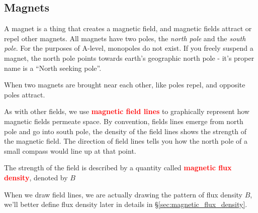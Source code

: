 \documentclass[a4paper,12pt]{book}
\newcommand{\keypoint}[1]{\textbf{\textcolor{red}{#1}}}
\newcommand{\keypoint}[1]{\textbf{\textcolor{red}{#1}}}
\begin{document}
\subsection{Magnets}

A magnet is a thing that creates a magnetic field, and magnetic fields attract or repel other magnets. All magnets have two poles, the \emph{north pole} and the \emph{south pole}. For the purposes of A-level, monopoles do not exist. If you freely suspend a magnet, the north pole points towards earth's geographic north pole - it's proper name is a ``North seeking pole''.

When two magnets are brought near each other, like poles repel, and opposite poles attract. 

As with other fields, we use \keypoint{magnetic field lines} to graphically represent how magnetic fields permeate space. By convention, fields lines emerge from north pole and go into south pole, the density of the field lines shows the strength of the magnetic field. The direction of field lines tells you how the north pole of a small compass would line up at that point.

The strength of the field is described by a quantity called \keypoint{magnetic flux density}, denoted by $B$

When we draw field lines, we are actually drawing the pattern of flux density $B$, we'll better define flux density later in details in \S\ref{sec:magnetic_flux_density}.

\begin{center}
\end{center}
\end{document}
